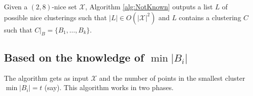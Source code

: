 \documentclass[11pt]{article}
\begin{document}
\begin{theorem}
Given a $(2,8)$-nice set $\mathcal{X}$, Algorithm \ref{alg:NotKnown} outputs a list $L$ of possible nice clusterings such that $|L| \in O(|\mathcal{X}|^2)$ and $L$ contains a clustering $C$ such that $C|_B = \{B_1,\ldots,B_k\}$.
\end{theorem}

\subsection{Based on the knowledge of $\min |B_i|$}


The algorithm gets as input $\mathcal{X}$ and the number of points in the smallest cluster $\min |B_i| = t$ (say). This algorithm works in two phases.
\end{document}

